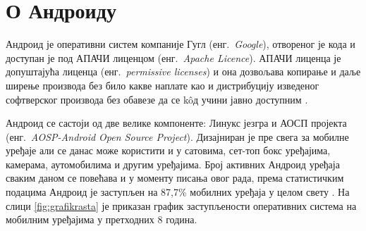 \documentclass[12pt,oneside]{memoir}
\theoremstyle{remark}
\begin{document}






\chapter{О Андроиду}
\label{chp:android}
Андроид је оперативни систем компаније Гугл  (енг.~{\em Google}), отвореног је кода и доступан је под АПАЧИ лиценцом  (енг.~{\em Apache Licence}). АПАЧИ лиценца је допуштајућа лиценца (енг.~{\em permissive licenses}) и она дозвољава копирање и даље ширење производа без било какве наплате као и дистрибуцију изведеног софтверског производа без обавезе да се k\^{o}д учини јавно доступним \cite{apache,aospapache}.

Андроид се састоји од две велике компоненте: Линукс језгра и АОСП пројекта (енг.~{\em AOSP-Android Open Source Project}). Дизајниран је пре свега за мобилне уређаје али се данас може користити и у сатовима, сет-топ бокс уређајима, камерама, аутомобилима и другим уређајима. Број активних Андроид уређаја сваким даном се повећава и у моменту писања овог рада, према статистичким подацима Андроид је заступљен на 87,7\% мобилних уређаја у целом свету \cite{marketshare}. На слици \ref{fig:grafikrasta} је приказан график заступљености оперативних система на мобилним уређајима у претходних 8 година.
\end{document}
